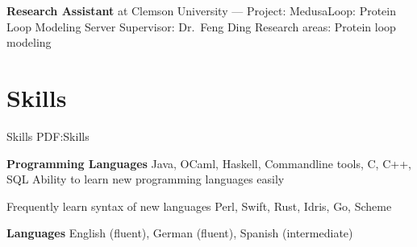 \documentclass[letterpaper,10pt,oneside]{simpleresume}
\begin{document}
\begin{minipage}[t][0pt]{\linewidth}
\begin{body}
\textbf{Research Assistant} at Clemson University
\hfill
{} --- 
\BulletItem%
Project:
MedusaLoop: Protein Loop Modeling Server
\BulletItem%
Supervisor:
Dr.\ Feng Ding
\BulletItem%
Research areas:
Protein loop modeling

\section%
{Skills}
{Skills}
{PDF:Skills}

\textbf{Programming Languages}
\BulletItem%
Java, OCaml, Haskell, Commandline tools, C, C++, SQL
\BulletItem%
Ability to learn new programming languages easily
\begin{detail}
\SubBulletItem%
Frequently learn syntax of new languages
\SubBulletItem%
Perl, Swift, Rust, Idris, Go, Scheme
\end{detail}
\textbf{Languages}
\BulletItem%
English (fluent), German (fluent), Spanish (intermediate)
\end{body}

\end{minipage}
\end{document}
